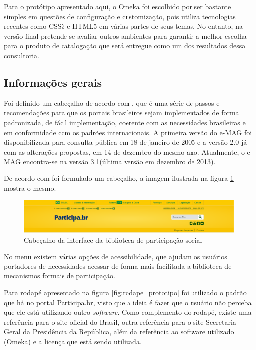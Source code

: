 Para o protótipo apresentado aqui, o Omeka foi escolhido por ser bastante simples em questões de configuração e customização, pois utiliza tecnologias recentes como CSS3 e HTML5 em várias partes de seus temas. No entanto, na versão final pretende-se avaliar outros ambientes para garantir a melhor escolha para o produto de catalogação que será entregue como um dos resultados dessa consultoria. 

\subsection*{Informações gerais}

Foi definido um cabeçalho de acordo com \cite{emag2013usabilidade}, que é uma série de passos e recomendações para que os portais brasileiros sejam implementados de forma padronizada, de fácil implementação, coerente com as necessidades brasileiras e em conformidade com os padrões internacionais. A primeira versão do e-MAG foi disponibilizada para consulta pública em 18 de janeiro de 2005 e a versão 2.0 já com as alterações propostas, em 14 de dezembro do mesmo ano. Atualmente, o e-MAG encontra-se na versão 3.1(última versão em dezembro de 2013). 

De acordo com \cite{emag2013usabilidade} foi formulado um cabeçalho, a imagem ilustrada na figura \ref{fig:cab_prototipo} mostra o mesmo.

\graphicspath{{figuras/prototipo/}}
\begin{figure}[H]
\centering
\includegraphics[width=1.0\textwidth]{cabecalho}
\caption{Cabeçalho da interface da biblioteca de participação social}
\label{fig:cab_prototipo}
\end{figure}

No menu existem várias opções de acessibilidade, que ajudam os usuários portadores de necessidades acessar de forma mais facilitada a biblioteca de mecanismos formais de participação.

Para rodapé apresentado na figura \ref{fig:rodape_prototipo} foi utilizado o padrão que há no portal Participa.br, visto que a ideia é fazer que o usuário não perceba que ele está utilizando outro \textit{software}. Como complemento do rodapé, existe uma referência para o site oficial do Brasil, outra referência para o site Secretaria Geral da Presidência da República, além da referência ao software utilizado (Omeka) e a licença que está sendo utilizada.

